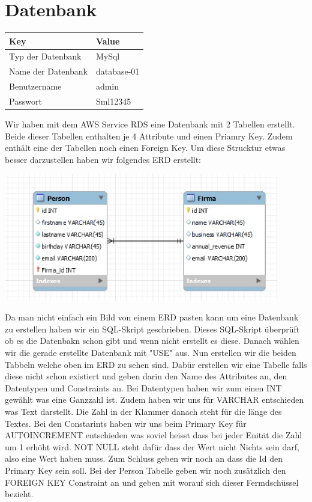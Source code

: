 \documentclass{article}
\begin{document}
\clearpage

\section{Datenbank}
\begin{center}
    

\begin{tabular}{|l|l|}
\hline
\textbf{Key} & \textbf{Value} \\ \hline
Typ der Datenbank & MySql \\ \hline
Name der Datenbank & database-01 \\ \hline
Benutzername & admin \\ \hline
Passwort & Sml12345 \\ \hline

\end{tabular}
\end{center}

\noindent Wir haben mit dem AWS Service RDS eine Datenbank mit 2 Tabellen erstellt. Beide dieser Tabellen enthalten je 4 Attribute und einen Priamry Key. Zudem enthält eine der Tabellen noch einen Foreign Key. Um diese Strucktur etwas besser darzustellen haben wir folgendes ERD erstellt:

\begin{center}
    \includegraphics[width=12cm]{images/database-erd.jpg}
\end{center}

\noindent Da man nicht einfach ein Bild von einem ERD pasten kann um eine Datenbank zu erstellen haben wir ein SQL-Skript geschrieben. Dieses SQL-Skript überprüft ob es die Datenbakn schon gibt und wenn nicht erstellt es diese. Danach wählen wir die gerade erstellte Datenbank mit "USE" aus. Nun erstellen wir die beiden Tabbeln welche oben im ERD zu sehen sind. Dabür erstellen wir eine Tabelle falls diese nicht schon existiert und geben darin den Name des Attributes an, den Datentypen und Constraints an. Bei Datentypen haben wir zum einen INT gewählt was eine Ganzzahl ist. Zudem haben wir uns für VARCHAR entschieden was Text darstellt. Die Zahl in der Klammer danach steht für die länge des Textes. Bei den Constarints haben wir uns beim Primary Key für AUTOINCREMENT entschieden was soviel heisst dass bei jeder Enität die Zahl um 1 erhöht wird. NOT NULL steht dafür dass der Wert nicht Nichts sein darf, also eine Wert haben muss. Zum Schluss geben wir noch an dass die Id den Primary Key sein soll. Bei der Person Tabelle geben wir noch zusätzlich den FOREIGN KEY Constraint an und geben mit worauf sich dieser Fermdschüssel bezieht. 
\end{document}
